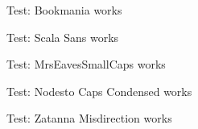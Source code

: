\documentclass{article}
\begin{document}
Test: {\testbookmania Bookmania works}

Test: {\testscalasans Scala Sans works}

Test: {\testmrseaves MrsEavesSmallCaps works}

Test: {\testnodesto Nodesto Caps Condensed works}

Test: {\testzatanna Zatanna Misdirection works}
\end{document}
